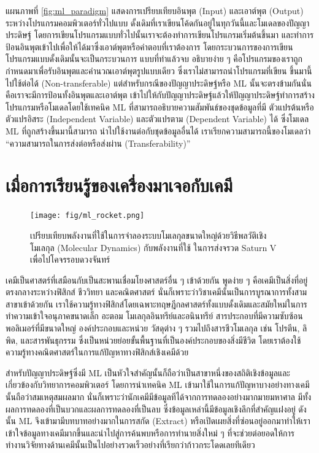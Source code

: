 แผนภาพที่ \ref{fig:ml_paradigm} แสดงการเปรียบเทียบอินพุต (Input) และเอาต์พุต (Output) ระหว่างโปรแกรมคอมพิวเตอร์ทั่วไปแบบ%
ดั้งเดิมที่เราเขียนโค้ดกันอยู่ในทุกวันนี้และโมเดลของปัญญาประดิษฐ์ โดยการเขียนโปรแกรมแบบทั่วไปนั้นเราจะต้องทำการเขียนโปรแกรมเริ่มต้นขึ้นมา%
และทำการป้อนอินพุตเข้าไปเพื่อให้ได้มาซึ่งเอาต์พุตหรือคำตอบที่เราต้องการ โดยกระบวนการของการเขียนโปรแกรมแบบดั้งเดิมนั้นจะเป็นกระบวนการ%
แบบที่ทำแล้วจบ อธิบายง่าย ๆ คือโปรแกรมของเราถูกกำหนดมาเพื่อรับอินพุตและคำนวณเอาต์พุตรูปแบบเดียว ซึ่งเราไม่สามารถนำโปรแกรมที่เขียน%
ขึ้นมานี้ไปใช้ต่อได้ (Non-transferable) แต่สำหรับกรณีของปัญญาประดิษฐ์หรือ ML นั้นจะตรงข้ามกันนั่นคือเราจะมีการป้อนทั้งอินพุตและเอาต์พุต%
เข้าไปให้กับปัญญาประดิษฐ์แล้วให้ปัญญาประดิษฐ์ทำการสร้างโปรแกรมหรือโมเดลโดยใช้เทคนิค ML ที่สามารถอธิบายความสัมพันธ์ของชุดข้อมูลที่มี%
ตัวแปรต้นหรือตัวแปรอิสระ (Independent Variable) และตัวแปรตาม (Dependent Variable) ได้ ซึ่งโมเดล ML ที่ถูกสร้างขึ้นมานี้สามารถ%
นำไปใช้งานต่อกับชุดข้อมูลอื่นได้ เราเรียกความสามารถนี้ของโมเดลว่า \enquote{ความสามารถในการส่งต่อหรือส่งผ่าน (Transferability)}

\section{เมื่อการเรียนรู้ของเครื่องมาเจอกับเคมี}
\label{sec:ml_meets_chem}

\begin{figure}[htbp]
    \centering
    \texttt{[image: fig/ml\_rocket.png]}
    \caption{เปรียบเทียบพลังงานที่ใช้ในการจำลองระบบโมเลกุลขนาดใหญ่ด้วยวิธีพลวัติเชิงโมเลกุล (Molecular Dynamics) กับพลังงานที่ใช้%
    ในการส่งจรวด Saturn V เพื่อไปโคจรรอบดวงจันทร์}
    \label{fig:ml_rocket}
\end{figure}

เคมีเป็นศาสตร์ที่เสมือนกับเป็นสะพานเชื่อมโยงศาสตร์อื่น ๆ เข้าด้วยกัน พูดง่าย ๆ คือเคมีเป็นสิ่งที่อยู่ตรงกลางระหว่างฟิสิกส์ ชีววิทยา และคณิตศาสตร์
นั่นก็เพราะว่าวิชาเคมีนั้นเป็นการบูรณาการทั้งสามสาขาเข้าด้วยกัน เราใช้ความรู้ทางฟิสิกส์โดยเฉพาะทฤษฎีกลศาสตร์ทั้งแบบดั้งเดิมและสมัยใหม่ในการ%
ทำความเข้าใจอนุภาคขนาดเล็ก อะตอม โมเลกุลอินทรีย์และอนินทรีย์ สารประกอบที่มีความซับซ้อน พอลิเมอร์ที่มีขนาดใหญ่ องค์ประกอบและหน่วย%
วัสดุต่าง ๆ รวมไปถึงสารชีวโมเลกุล เช่น โปรตีน, ลิพิด, และสารพันธุกรรม ซึ่งเป็นหน่วยย่อยขั้นพื้นฐานที่เป็นองค์ประกอบของสิ่งมีชีวิต 
โดยเราต้องใช้ความรู้ทางคณิตศาสตร์ในการแก้ปัญหาทางฟิสิกส์เชิงเคมีด้วย

สำหรับปัญญาประดิษฐ์ซึ่งมี ML เป็นหัวใจสำคัญนั้นก็ถือว่าเป็นสาขาหนึ่งของสถิติเชิงข้อมูลและเกี่ยวข้องกับวิทยาการคอมพิวเตอร์ โดยการนำเทคนิค 
ML เข้ามาใช้ในการแก้ปัญหาบางอย่างทางเคมีนั้นถือว่าสมเหตุสมผลมาก นั่นก็เพราะว่านักเคมีมีข้อมูลทีได้จากการทดลองอย่างมากมายมหาศาล 
มีทั้งผลการทดลองที่เป็นบวกและผลการทดลองที่เป็นลบ ซึ่งข้อมูลเหล่านี้มีข้อมูลเชิงลึกที่สำคัญแฝงอยู่ ดังนั้น ML จึงเข้ามามีบทบาทอย่างมากในการสกัด 
(Extract) หรือเปิดเผยสิ่งที่ซ่อนอยู่ออกมาทำให้เราเข้าใจข้อมูลทางเคมีมากขึ้นและนำไปสู่การค้นพบหรือการทำนายสิ่งใหม่ ๆ ที่จะช่วยต่อยอดให้การ%
ทำงานวิจัยทางด้านเคมีนั้นเป็นไปอย่างรวดเร็วอย่างที่เรียกว่าก้าวกระโดดเลยทีเดียว\autocite{cartwright2020,zotero-817}

